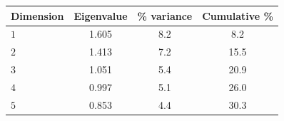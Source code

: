 \begin{tabular}{lccc}
\toprule
Dimension & Eigenvalue & \% variance & Cumulative \% \\
\midrule
$1$ & 1.605 & 8.2 & 8.2 \\
$2$ & 1.413 & 7.2 & 15.5 \\
$3$ & 1.051 & 5.4 & 20.9 \\
$4$ & 0.997 & 5.1 & 26.0 \\
$5$ & 0.853 & 4.4 & 30.3 \\
\bottomrule
\end{tabular}
